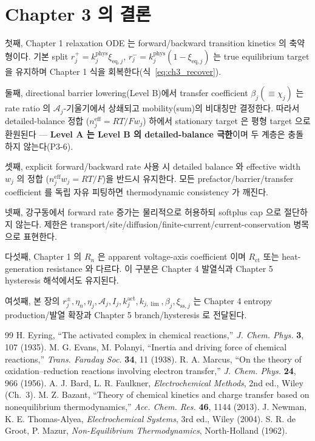 \documentclass[11pt,a4paper]{article}
\newcommand{\eff}{\mathrm{eff}}
\newcommand{\eq}{\mathrm{eq}}
\newcommand{\ct}{\mathrm{ct}}
\newcommand{\sstat}{\mathrm{ss}}
\begin{document}
\section{Chapter 3 의 결론}\label{sec:ch3_concl}
첫째, Chapter 1 relaxation ODE 는 forward/backward transition kinetics 의 축약형이다. 기본 split
$r_j^+=k_j^{\mathrm{phys}}\xi_{\eq,j}$, $r_j^-=k_j^{\mathrm{phys}}(1-\xi_{\eq,j})$ 는 true equilibrium target
을 유지하며 Chapter 1 식을 회복한다(식~\eqref{eq:ch3_recover}).

둘째, directional barrier lowering(Level B)에서 transfer coefficient $\beta_j(\equiv\chi_j)$ 는 rate ratio 의
$\mathcal A_j$-기울기에서 상쇄되고 mobility(sum)의 비대칭만 결정한다. 따라서 detailed-balance 정합
($n_j^{\eff}=RT/Fw_j$) 하에서 stationary target 은 평형 target 으로 환원된다 — \textbf{Level A 는 Level B 의
detailed-balance 극한}이며 두 계층은 충돌하지 않는다(P3-6).

셋째, explicit forward/backward rate 사용 시 detailed balance 와 effective width $w_j$ 의 정합
($n_j^{\eff}w_j=RT/F$)을 반드시 유지한다. 모든 prefactor/barrier/transfer coefficient 를 독립 자유
피팅하면 thermodynamic consistency 가 깨진다.

넷째, 강구동에서 forward rate 증가는 물리적으로 허용하되 softplus cap 으로 절단하지 않는다. 제한은
transport/site/diffusion/finite-current/current-conservation 병목으로 표현한다.

다섯째, Chapter 1 의 $R_n$ 은 apparent voltage-axis coefficient 이며 $R_{\ct}$ 또는 heat-generation
resistance 와 다르다. 이 구분은 Chapter 4 발열식과 Chapter 5 hysteresis 해석에서도 유지된다.

여섯째, 본 장의 $r_j^\pm,\eta_n,\eta_j,\mathcal A_j,I_j,k_j^{\mathrm{act}},k_{j,\lim},\beta_j,\xi_{\sstat,j}$ 는
Chapter 4 entropy production/발열 확장과 Chapter 5 branch/hysteresis 로 전달된다.

\begin{thebibliography}{99}
 H. Eyring, ``The activated complex in chemical reactions,'' \emph{J. Chem. Phys.} \textbf{3}, 107 (1935).
 M. G. Evans, M. Polanyi, ``Inertia and driving force of chemical reactions,'' \emph{Trans. Faraday Soc.} \textbf{34}, 11 (1938).
 R. A. Marcus, ``On the theory of oxidation--reduction reactions involving electron transfer,'' \emph{J. Chem. Phys.} \textbf{24}, 966 (1956).
 A. J. Bard, L. R. Faulkner, \emph{Electrochemical Methods}, 2nd ed., Wiley (Ch.~3).
 M. Z. Bazant, ``Theory of chemical kinetics and charge transfer based on nonequilibrium thermodynamics,'' \emph{Acc. Chem. Res.} \textbf{46}, 1144 (2013).
 J. Newman, K. E. Thomas-Alyea, \emph{Electrochemical Systems}, 3rd ed., Wiley (2004).
 S. R. de Groot, P. Mazur, \emph{Non-Equilibrium Thermodynamics}, North-Holland (1962).
\end{thebibliography}
\end{document}
